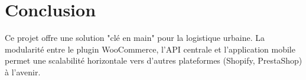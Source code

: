\newpage


\section{Conclusion}
Ce projet offre une solution "clé en main" pour la logistique urbaine. La modularité entre le plugin WooCommerce, l'API centrale et l'application mobile permet une scalabilité horizontale vers d'autres plateformes (Shopify, PrestaShop) à l'avenir.